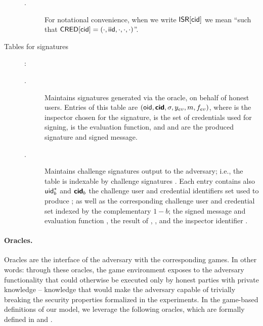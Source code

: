 \begin{description}
\begin{description}
  \item[\ISR.] For notational convenience, when we write $\mathsf{ISR}[\mathsf{cid}]$ we mean
    ``\iid such that $\mathsf{CRED}[\mathsf{cid}] = (\cdot, \mathsf{iid}, \cdot, \cdot, \cdot)$''.
  \end{description}
\item[Tables for signatures]:
  \begin{description}
  \item[\SIG.] Maintains signatures generated via the \SIGN oracle, on behalf
    of honest users. Entries of this table are $(\mathsf{oid},\boldsymbol{\mathsf{cid}},\sigma,y_{ev},m,
    f_{ev})$,
    where \oid is the inspector chosen for the signature, \scid is the set of
    credentials used for signing, \feval is the evaluation function, and \sig
    and \msg are the produced signature and signed message.
  \item[\CSIG.] Maintains challenge signatures output to the adversary; i.e.,
    the table is indexable by challenge signatures \csig.
    Each entry contains also $\mathsf{uid}^*_b$ and $\boldsymbol{\mathsf{cid}}_b$ the challenge user and
    credential identifiers set used to produce \csig; as well as the
    corresponding challenge user and credential set indexed by the complementary
    $1-b$; the signed message \msg and evaluation function \feval, the result of
    \feval, \yeval, and the inspector identifier \oid.
  \end{description}
\end{description}

\paragraph{Oracles.} %
Oracles are the interface of the adversary with the corresponding games. In
other words: through these oracles, the game environment exposes to the adversary
functionality that could otherwise be executed only by honest parties with
private knowledge -- knowledge that would make the adversary capable of
trivially breaking the security properties formalized in the experiments.
In the game-based definitions of our \UAS model, we leverage the following
oracles, which are formally defined in  and
. 


